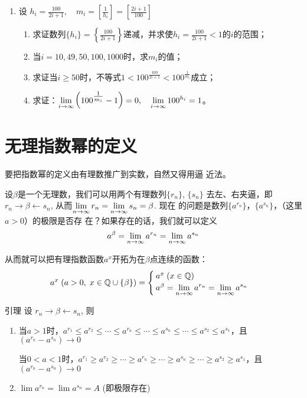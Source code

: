 \begin{enumerate}
\item  设 $h_{i}=\frac{100}{2 i+1},\quad  m_{i}=\left[\frac{1}{h_{i}}\right]=\left[\frac{2 i+1}{100}\right]$
\begin{enumerate}
  \item 求证数列$\{h_i\}=\left\{\frac{100}{2 i+1}\right\}$递减，并求使$h_i=\frac{100}{2i+1}<1$的$i$的范围；
  \item 当$i=10,49,50,100,1000$时，求$m_i$的值；
  \item 求证当$i\ge 50$时，不等式$1<100^{\tfrac{100}{2i+1}}<100^{\tfrac{1}{m_i}}$成立；
  \item 求证：$\displaystyle\lim_{i\to\infty}\left(100^{\tfrac{1}{m_i}}-1\right)=0,\quad \displaystyle\lim_{i\to\infty}100^{h_i}=1$。
\end{enumerate}
\end{enumerate}

\section{无理指数幂的定义}
要把指数幂的定义由有理数推广到实数，自然又得用逼
近法。

设$\beta$是一个无理数，我们可以用两个有理数列$\{r_n\}$, $\{s_n\}$
去左、右夹逼，即$r_n\to \beta\leftarrow s_n$, 从而$\displaystyle\lim_{n\to\infty}r_n=\displaystyle\lim_{n\to\infty}s_n=\beta$. 现在
的问题是数列$\{a^{r_n}\}$，$\{a^{s_n}\}$，（这里$a>0$）的极限是否存
在？如果存在的话，我们就可以定义
\[a^{\beta}=\displaystyle\lim_{n\to\infty}a^{r_n}=\displaystyle\lim_{n\to\infty}a^{s_n}\]

从而就可以把有理指数函数$a^x$开拓为在$\beta$点连续的函数：
\[a^x\; (a>0,\; x\in \mathbb{Q}\cup\{\beta\})=\begin{cases}
  a^x\;  (x\in\mathbb{Q})\\
  a^{\beta}=\displaystyle\lim_{n\to\infty}a^{r_n}=\displaystyle\lim_{n\to\infty}a^{s_n}
\end{cases}\]

\begin{blk}{引理}
   设 $r_{n} \rightarrow \beta \leftarrow s_{n}$, 则
\begin{enumerate}
  \item 当$a>1$时，$a^{r_1}\le a^{r_2}\le \cdots\le a^{r_n}\le \cdots \le a^{s_n}\le \cdots\le a^{s_2}\le a^{s_1}$，且$\left(a^{r_n}-a^{s_n}\right)\to 0$
 
  当$0<a<1$时，$a^{r_1}\ge a^{r_2}\ge \cdots\ge a^{r_n}\ge \cdots \ge a^{s_n}\ge \cdots\ge a^{s_2}\ge a^{s_1}$，且$\left(a^{r_n}-a^{s_n}\right)\to 0$

  \item $\lim a^{r_n}=\lim a^{s_{n}}=A$ (即极限存在) 
\end{enumerate}
\end{blk}

